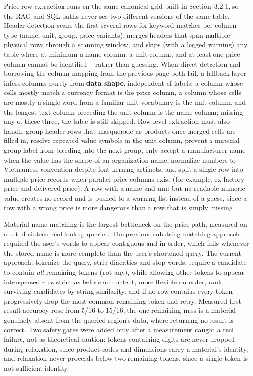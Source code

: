 \documentclass[11pt,a4paper]{article}
\begin{document}
Price-row extraction runs on the same canonical grid built in
Section~3.2.1, so the RAG and SQL paths never see two different versions of
the same table. Header detection scans the first several rows for
keyword matches per column type (name, unit, group, price variants), merges
headers that span multiple physical rows through a scanning window, and
skips (with a logged warning) any table where at minimum a name column, a
unit column, and at least one price column cannot be identified -- rather
than guessing. When direct detection and borrowing the column mapping from
the previous page both fail, a fallback layer infers columns purely from
\textbf{data shape}, independent of labels: a column whose cells mostly
match a currency format is the price column, a column whose cells are mostly
a single word from a familiar unit vocabulary is the unit column, and the
longest text column preceding the unit column is the name column; missing
any of these three, the table is still skipped. Row-level extraction must
also handle group-header rows that masquerade as products once merged cells
are filled in, resolve repeated-value symbols in the unit column, prevent a
material-group label from bleeding into the next group, only accept a
manufacturer name when the value has the shape of an organization name,
normalize numbers to Vietnamese convention despite font kerning artifacts,
and split a single row into multiple price records when parallel price
columns exist (for example, ex-factory price and delivered price). A row
with a name and unit but no readable numeric value creates no record and is
pushed to a warning list instead of a guess, since a row with a wrong price
is more dangerous than a row that is simply missing.

Material-name matching is the largest bottleneck on the price path, measured
on a set of sixteen real lookup queries. The previous substring-matching
approach required the user's words to appear contiguous and in order, which
fails whenever the stored name is more complete than the user's shortened
query. The current approach: tokenize the query, strip diacritics and stop
words; require a candidate to contain \emph{all} remaining tokens (not any),
while allowing other tokens to appear interspersed -- as strict as before on
content, more flexible on order; rank surviving candidates by string
similarity; and if no row contains every token, progressively drop the most
common remaining token and retry. Measured first-result accuracy rose from
5/16 to 15/16; the one remaining miss is a material genuinely absent from
the queried region's data, where returning no result is correct. Two safety
gates were added only after a measurement caught a real failure, not as
theoretical caution: tokens containing digits are never dropped during
relaxation, since product codes and dimensions carry a material's identity;
and relaxation never proceeds below two remaining tokens, since a single
token is not sufficient identity.
\end{document}
